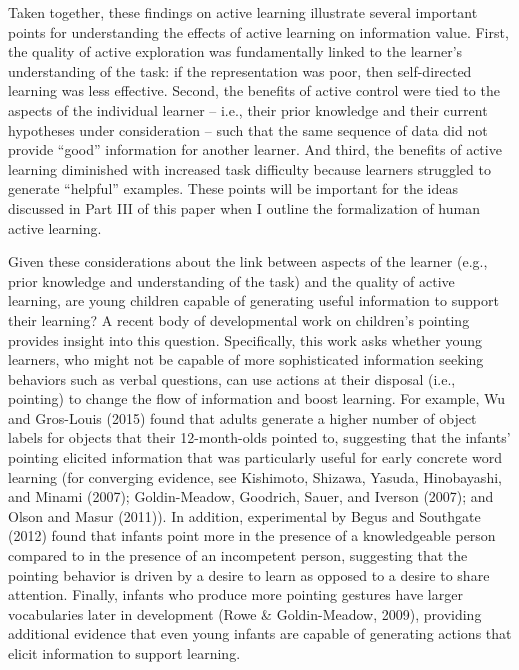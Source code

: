 \documentclass[english,floatsintext,man]{apa6}
\theoremstyle{definition}
\theoremstyle{definition}
\theoremstyle{definition}
\theoremstyle{remark}
\begin{document}
Taken together, these findings on active learning illustrate several
important points for understanding the effects of active learning on
information value. First, the quality of active exploration was
fundamentally linked to the learner's understanding of the task: if the
representation was poor, then self-directed learning was less effective.
Second, the benefits of active control were tied to the aspects of the
individual learner -- i.e., their prior knowledge and their current
hypotheses under consideration -- such that the same sequence of data
did not provide \enquote{good} information for another learner. And
third, the benefits of active learning diminished with increased task
difficulty because learners struggled to generate \enquote{helpful}
examples. These points will be important for the ideas discussed in Part
III of this paper when I outline the formalization of human active
learning.

Given these considerations about the link between aspects of the learner
(e.g., prior knowledge and understanding of the task) and the quality of
active learning, are young children capable of generating useful
information to support their learning? A recent body of developmental
work on children's pointing provides insight into this question.
Specifically, this work asks whether young learners, who might not be
capable of more sophisticated information seeking behaviors such as
verbal questions, can use actions at their disposal (i.e., pointing) to
change the flow of information and boost learning. For example, Wu and
Gros-Louis (2015) found that adults generate a higher number of object
labels for objects that their 12-month-olds pointed to, suggesting that
the infants' pointing elicited information that was particularly useful
for early concrete word learning (for converging evidence, see
Kishimoto, Shizawa, Yasuda, Hinobayashi, and Minami (2007);
Goldin-Meadow, Goodrich, Sauer, and Iverson (2007); and Olson and Masur
(2011)). In addition, experimental by Begus and Southgate (2012) found
that infants point more in the presence of a knowledgeable person
compared to in the presence of an incompetent person, suggesting that
the pointing behavior is driven by a desire to learn as opposed to a
desire to share attention. Finally, infants who produce more pointing
gestures have larger vocabularies later in development (Rowe \&
Goldin-Meadow, 2009), providing additional evidence that even young
infants are capable of generating actions that elicit information to
support learning.
\end{document}
